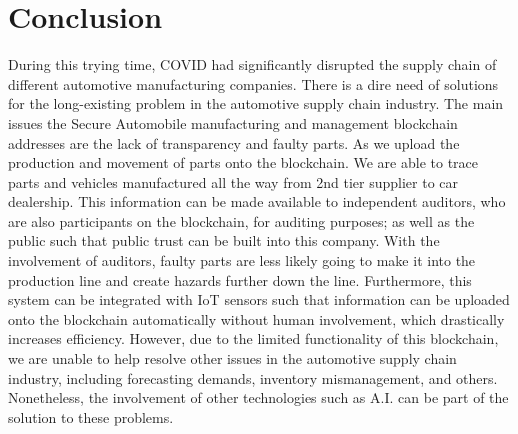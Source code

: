\documentclass[12pt]{article}
\begin{document}
\section{Conclusion}
During this trying time, COVID had significantly disrupted the supply chain of different automotive manufacturing companies. There is a dire need of solutions for the long-existing problem in the automotive supply chain industry. The main issues the Secure Automobile manufacturing and management blockchain addresses are the lack of transparency and faulty parts. As we upload the production and movement of parts onto the blockchain. We are able to trace parts and vehicles manufactured all the way from 2nd tier supplier to car dealership. This information can be made available to independent auditors, who are also participants on the blockchain, for auditing purposes; as well as the public such that public trust can be built into this company. With the involvement of auditors, faulty parts are less likely going to make it into the production line and create hazards further down the line. Furthermore, this system can be integrated with IoT sensors such that information can be uploaded onto the blockchain automatically without human involvement, which drastically increases efficiency. However, due to the limited functionality of this blockchain, we are unable to help resolve other issues in the automotive supply chain industry, including forecasting demands, inventory mismanagement, and others. Nonetheless, the involvement of other technologies such as A.I. can be part of the solution to these problems.

\pagebreak



\end{document}
